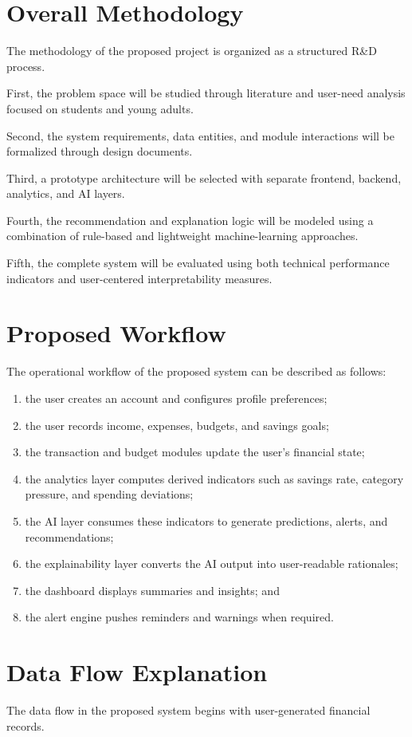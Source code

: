 \documentclass[12pt,a4paper]{report}
\begin{document}
\section{Overall Methodology}
The methodology of the proposed project is organized as a structured R\&D process.

First,
the problem space will be studied through literature and user-need analysis focused on students and young adults.

Second,
the system requirements,
data entities,
and module interactions will be formalized through design documents.

Third,
a prototype architecture will be selected with separate frontend,
backend,
analytics,
and AI layers.

Fourth,
the recommendation and explanation logic will be modeled using a combination of rule-based and lightweight machine-learning approaches.

Fifth,
the complete system will be evaluated using both technical performance indicators and user-centered interpretability measures.

\section{Proposed Workflow}
The operational workflow of the proposed system can be described as follows:
\begin{enumerate}[label=\arabic*.]
\item the user creates an account and configures profile preferences;
\item the user records income,
expenses,
budgets,
and savings goals;
\item the transaction and budget modules update the user’s financial state;
\item the analytics layer computes derived indicators such as savings rate,
category pressure,
and spending deviations;
\item the AI layer consumes these indicators to generate predictions,
alerts,
and recommendations;
\item the explainability layer converts the AI output into user-readable rationales;
\item the dashboard displays summaries and insights;
and
\item the alert engine pushes reminders and warnings when required.
\end{enumerate}

\section{Data Flow Explanation}
The data flow in the proposed system begins with user-generated financial records.
\end{document}
